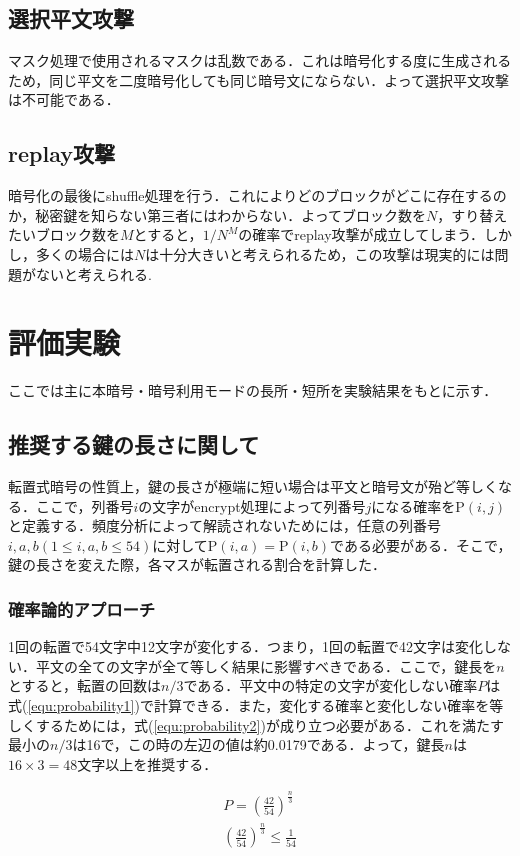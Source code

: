 \documentclass[a4j,titlepage]{jsarticle}
\begin{document}
\subsection{選択平文攻撃}
マスク処理で使用されるマスクは乱数である．これは暗号化する度に生成されるため，同じ平文を二度暗号化しても同じ暗号文にならない．よって選択平文攻撃は不可能である．

\subsection{replay攻撃}
暗号化の最後にshuffle処理を行う．これによりどのブロックがどこに存在するのか，秘密鍵を知らない第三者にはわからない．よってブロック数を\(N\)，すり替えたいブロック数を\(M\)とすると，\(1/N^M\)の確率でreplay攻撃が成立してしまう．しかし，多くの場合には\(N\)は十分大きいと考えられるため，この攻撃は現実的には問題がないと考えられる.

\section{評価実験}
ここでは主に本暗号・暗号利用モードの長所・短所を実験結果をもとに示す．
\subsection{推奨する鍵の長さに関して}
転置式暗号の性質上，鍵の長さが極端に短い場合は平文と暗号文が殆ど等しくなる．ここで，列番号\(i\)の文字がencrypt処理によって列番号\(j\)になる確率を\(\mathrm{P}(i,j)\)と定義する．頻度分析によって解読されないためには，任意の列番号\(i,a,b(1\leq i,a,b\leq 54)\)に対して\(\mathrm{P}(i,a)=\mathrm{P}(i,b)\)である必要がある．そこで，鍵の長さを変えた際，各マスが転置される割合を計算した．

\subsubsection{確率論的アプローチ}
1回の転置で54文字中12文字が変化する．つまり，1回の転置で42文字は変化しない．平文の全ての文字が全て等しく結果に影響すべきである．ここで，鍵長を\(n\)とすると，転置の回数は\(n/3\)である．平文中の特定の文字が変化しない確率\(P\)は式(\ref{equ:probability1})で計算できる．また，変化する確率と変化しない確率を等しくするためには，式(\ref{equ:probability2})が成り立つ必要がある．これを満たす最小の\(n/3\)は16で，この時の左辺の値は約0.0179である．よって，鍵長\(n\)は\(16\times3=48\)文字以上を推奨する．

\begin{align}
  P = \left(\frac{42}{54}\right)^\frac{n}{3} \label{equ:probability1} \\
  \left(\frac{42}{54}\right)^\frac{n}{3} \leq \frac{1}{54} \label{equ:probability2}
\end{align}
\end{document}
